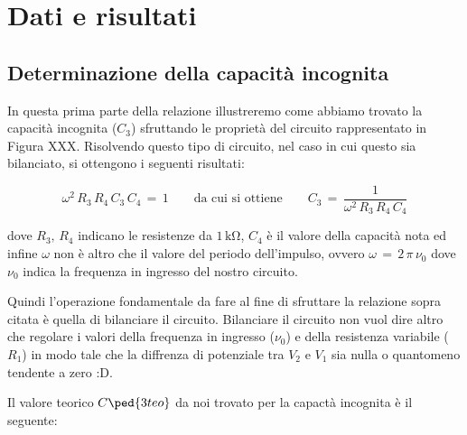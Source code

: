 \section*{Dati e risultati}

\subsection*{Determinazione della capacità incognita}

In questa prima parte della relazione illustreremo come abbiamo trovato la capacità incognita ($C_3$) sfruttando le proprietà del circuito rappresentato in Figura XXX.
Risolvendo questo tipo di circuito, nel caso in cui questo sia bilanciato, si ottengono i seguenti risultati:

\begin{equation}
	\omega^2\,R_3\,R_4\,C_3\,C_4 \,=\, 1 \qquad \text{da cui si ottiene} \qquad C_3 \,=\, \frac{1}{\omega^2\,R_3\,R_4\,C_4}
	\label{eq:C_imm}
\end{equation}


dove $R_3,\,R_4$ indicano le resistenze da $1\,\si{\kilo\ohm}$, $C_4$ è il valore della capacità nota ed infine $\omega$ non è altro che il valore del periodo dell'impulso, ovvero $\omega \,=\, 2\,\pi\,\nu_0$ dove $\nu_0$ indica la frequenza in ingresso del nostro circuito.

Quindi l'operazione fondamentale da fare al fine di sfruttare la relazione sopra citata è quella di bilanciare il circuito. Bilanciare il circuito non vuol dire altro che regolare i valori della frequenza in ingresso ($\nu_0$) e della resistenza variabile ($R_1$) in modo tale che la diffrenza di potenziale tra $V_2$ e $V_1$ sia nulla o quantomeno tendente a zero :D.

Il valore teorico $C\ped{3teo}$ da noi trovato per la capactà incognita è il seguente:

